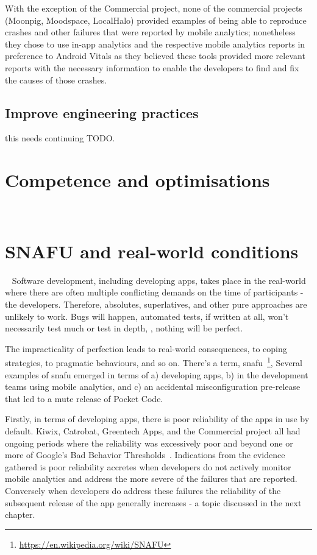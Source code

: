 With the exception of the Commercial project, none of the commercial projects (Moonpig, Moodspace, LocalHalo) provided examples of being able to reproduce crashes and other failures that were reported by mobile analytics; nonetheless they chose to use in-app analytics and the respective mobile analytics reports in preference to Android Vitals as they believed these tools provided more relevant reports with the necessary information to enable the developers to find and fix the causes of those crashes.

\subsection{Improve engineering practices}
 this needs continuing TODO.

\section{Competence and optimisations}~\label{aiu-competence-and-optimisations}


\section{SNAFU and real-world conditions}~\label{aiu-snafu-and-real-world-conditions-section}
Software development, including developing apps, takes place in the real-world where there are often multiple conflicting demands on the time of participants - the developers. Therefore, absolutes, superlatives, and other pure approaches are unlikely to work. Bugs will happen, automated tests, if written at all, won't necessarily test much or test in depth, , nothing will be perfect.

The impracticality of perfection leads to real-world consequences, to coping strategies, to pragmatic behaviours, and so on. There's a term, snafu~\footnote{\url{https://en.wikipedia.org/wiki/SNAFU}}, Several examples of snafu emerged in terms of a) developing apps, b) in the development teams using mobile analytics, and c) an accidental misconfiguration pre-release that led to a mute release of Pocket Code.

Firstly, in terms of developing apps, there is poor reliability of the apps in use by default. Kiwix, Catrobat, Greentech Apps, and the Commercial project all had ongoing periods where the reliability was excessively poor and beyond one or more of Google's Bad Behavior Thresholds~\citep{play_console_help_android_vitals_2019}. Indications from the evidence gathered is poor reliability accretes when developers do not actively monitor mobile analytics and address the more severe of the failures that are reported. Conversely when developers do address these failures the reliability of the subsequent release of the app generally increases - a topic discussed in the next chapter.

